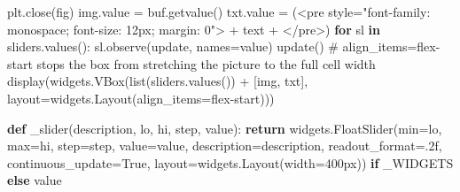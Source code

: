 \documentclass[
  letterpaper,
  DIV=11,
  numbers=noendperiod]{scrreprt}
\newenvironment{Shaded}{\begin{snugshade}}{\end{snugshade}}
\newcommand{\BuiltInTok}[1]{\textcolor[rgb]{0.00,0.23,0.31}{#1}}
\newcommand{\CommentTok}[1]{\textcolor[rgb]{0.37,0.37,0.37}{#1}}
\newcommand{\ControlFlowTok}[1]{\textcolor[rgb]{0.00,0.23,0.31}{\textbf{#1}}}
\newcommand{\KeywordTok}[1]{\textcolor[rgb]{0.00,0.23,0.31}{\textbf{#1}}}
\newcommand{\NormalTok}[1]{\textcolor[rgb]{0.00,0.23,0.31}{#1}}
\newcommand{\OperatorTok}[1]{\textcolor[rgb]{0.37,0.37,0.37}{#1}}
\newcommand{\StringTok}[1]{\textcolor[rgb]{0.13,0.47,0.30}{#1}}
\newcommand{\VariableTok}[1]{\textcolor[rgb]{0.07,0.07,0.07}{#1}}
\theoremstyle{plain}
\theoremstyle{plain}
\theoremstyle{definition}
\theoremstyle{definition}
\theoremstyle{definition}
\theoremstyle{plain}
\theoremstyle{plain}
\theoremstyle{remark}
\begin{document}
\begin{Shaded}
\begin{Highlighting}[]
\NormalTok{        plt.close(fig)}
\NormalTok{        img.value }\OperatorTok{=}\NormalTok{ buf.getvalue()}
\NormalTok{        txt.value }\OperatorTok{=}\NormalTok{ (}\StringTok{\textquotesingle{}\textless{}pre style="font{-}family: monospace; font{-}size: 12px; margin: 0"\textgreater{}\textquotesingle{}}
                     \OperatorTok{+}\NormalTok{ text }\OperatorTok{+} \StringTok{\textquotesingle{}\textless{}/pre\textgreater{}\textquotesingle{}}\NormalTok{)}
    \ControlFlowTok{for}\NormalTok{ sl }\KeywordTok{in}\NormalTok{ sliders.values():}
\NormalTok{        sl.observe(update, names}\OperatorTok{=}\StringTok{\textquotesingle{}value\textquotesingle{}}\NormalTok{)}
\NormalTok{    update()}
    \CommentTok{\# align\_items=\textquotesingle{}flex{-}start\textquotesingle{} stops the box from stretching the picture to the full cell width}
\NormalTok{    display(widgets.VBox(}\BuiltInTok{list}\NormalTok{(sliders.values()) }\OperatorTok{+}\NormalTok{ [img, txt],}
\NormalTok{                         layout}\OperatorTok{=}\NormalTok{widgets.Layout(align\_items}\OperatorTok{=}\StringTok{\textquotesingle{}flex{-}start\textquotesingle{}}\NormalTok{)))}


\KeywordTok{def}\NormalTok{ \_slider(description, lo, hi, step, value):}
    \ControlFlowTok{return}\NormalTok{ widgets.FloatSlider(}\BuiltInTok{min}\OperatorTok{=}\NormalTok{lo, }\BuiltInTok{max}\OperatorTok{=}\NormalTok{hi, step}\OperatorTok{=}\NormalTok{step, value}\OperatorTok{=}\NormalTok{value, description}\OperatorTok{=}\NormalTok{description,}
\NormalTok{                               readout\_format}\OperatorTok{=}\StringTok{\textquotesingle{}.2f\textquotesingle{}}\NormalTok{, continuous\_update}\OperatorTok{=}\VariableTok{True}\NormalTok{,}
\NormalTok{                               layout}\OperatorTok{=}\NormalTok{widgets.Layout(width}\OperatorTok{=}\StringTok{\textquotesingle{}400px\textquotesingle{}}\NormalTok{)) }\ControlFlowTok{if}\NormalTok{ \_WIDGETS }\ControlFlowTok{else}\NormalTok{ value}



\end{Highlighting}
\end{Shaded}
\end{document}
